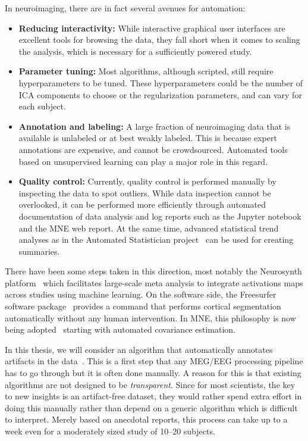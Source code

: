 In neuroimaging, there are in fact several avenues for automation:
\begin{itemize}[noitemsep,nolistsep,nosep]
\item \textbf{Reducing interactivity:} While interactive graphical user interfaces are excellent tools for browsing the data, they fall short when it comes to scaling the analysis, which is necessary for a sufficiently powered study. 

\item \textbf{Parameter tuning:} Most algorithms, although scripted, still require hyperparameters to be tuned. These hyperparameters could be the number of ICA components to choose or the regularization parameters, and can vary for each subject.
\item \textbf{Annotation and labeling:} A large fraction of neuroimaging data that is available is unlabeled or at best weakly labeled. This is because expert annotations are expensive, and cannot be crowdsourced. Automated tools based on unsupervised learning can play a major role in this regard.
\item \textbf{Quality control:} Currently, quality control is performed manually by inspecting the data to spot outliers. While data inspection cannot be overlooked, it can be performed more efficiently through automated documentation of data analysis and log reports such as the Jupyter notebook and the MNE web report. At the same time, advanced statistical trend analyses as in the Automated Statistician project~\citep{duvenaud2013structure} can be used for creating summaries.
\end{itemize}

There have been some steps taken in this direction, most notably the Neurosynth platform~\citep{yarkoni2011large} which facilitates large-scale meta analysis to integrate activations maps across studies using machine learning. On the software side, the Freesurfer software package~\citep{dale-fischl-etal:99, fischl-serena-etal:99} provides a  command that performs cortical segmentation automatically without any human intervention. In MNE, this philosophy is now being adopted~\citep{engemann2015automated_new} starting with automated covariance estimation.

In this thesis, we will consider an algorithm that automatically annotates artifacts in the data~\citep{jas2016automated, jas2017autoreject}. This is a first step that any \ac{MEG}/\ac{EEG} processing pipeline has to go through but it is often done manually. A reason for this is that existing algorithms are not designed to be \emph{transparent}. Since for most scientists, the key to new insights is an artifact-free dataset, they would rather spend extra effort in doing this manually rather than depend on a generic algorithm which is difficult to interpret. %
Merely based on anecdotal reports, this process can take up to a week even for a moderately sized study of 10--20 subjects.

